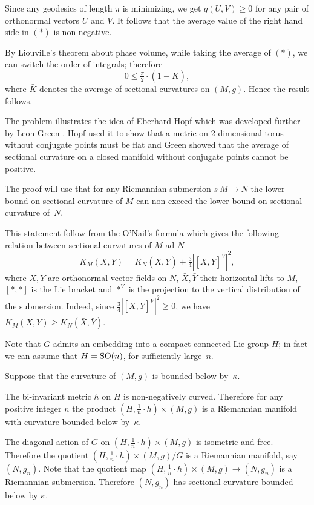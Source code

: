 Since any geodesics of length $\pi$ is minimizing,
we get $q(U,V)\ge0$ for any pair of orthonormal vectors $U$ and $V$.
It follows that the average value of the right hand side in $({*})$ is non-negative.

By Liouville's theorem about phase volume, while taking the average of $({*})$, we can switch the order of integrals;
therefore  
\[0\le \tfrac\pi2\cdot(1-\bar{K}),\]
where $\bar{K}$ denotes the average of sectional curvatures on $(M,g)$.
Hence the result follows.\qeds

The problem illustrates the idea of Eberhard Hopf \cite{hopf-conjugate}
which was developed further by Leon Green \cite{green}.
Hopf used it to show that a metric on 2-dimensional torus without conjugate points must be flat
and Green showed that the average of sectional curvature on a closed manifold without conjugate points cannot be positive.









 The proof will use that for any Riemannian submersion $s\:M\to N$
the lower bound on sectional curvature of $M$ can non exceed the lower bound on sectional curvature of~$N$.

This statement follow from the O'Nail's formula \cite[Theorem 3.20]{cheeger-ebin} 
which gives the following relation between sectional curvatures of $M$ ad $N$
\[K_M(X,Y)=K_N(\bar X, \bar Y)+\tfrac34|[\bar X,\bar Y]^V|^2,\]
where $X,Y$ are orthonormal vector fields on $N$, $\bar X, \bar Y$ their horizontal lifts to $M$, $[{*},{*}]$ is the Lie bracket and ${*}^V$ is the projection to the vertical distribution of the submersion.
Indeed, since $\tfrac34|[\bar X,\bar Y]^V|^2\ge 0$, we have $K_M(X,Y)\ge K_N(\bar X, \bar Y)$.

\medskip

Note that $G$ admits an embedding into a compact connected Lie group $H$;
in fact we can assume that $H=\mathrm{SO}(n)$, for sufficiently large~$n$.

Suppose that the curvature of $(M,g)$ is bounded below by~$\kappa$.

The bi-invariant metric $h$ on $H$ is non-negatively curved.
Therefore for any positive integer $n$ the product $(H,\tfrac1n\cdot h)\times (M,g)$ is a Riemannian manifold with  curvature bounded below by~$\kappa$.

The diagonal action of $G$ on $(H,\tfrac1n\cdot h)\times (M,g)$ is isometric and free. 
Therefore 
the quotient $(H,\tfrac1n\cdot h)\times (M,g)/G$
is a Riemannian manifold, say $(N,g_n)$.
Note that the quotient map $(H,\tfrac1n\cdot h)\times (M,g)\to (N,g_n)$ is a Riemannian submersion.
Therefore $(N,g_n)$ has sectional curvature bounded below by $\kappa$.


